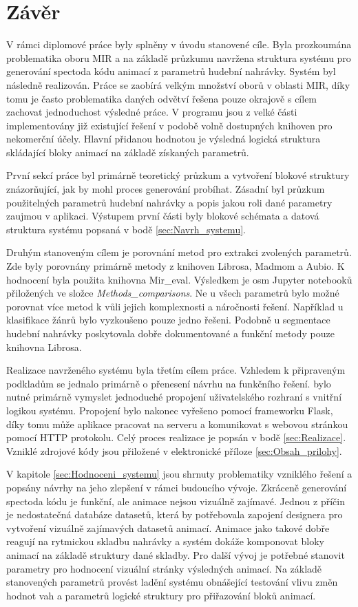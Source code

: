 \chapter*{Závěr}
{}


V rámci diplomové práce byly splněny v úvodu stanovené cíle. Byla prozkoumána problematika oboru \acs{MIR} a na základě průzkumu navržena struktura systému pro generování spectoda kódu animací z parametrů hudební nahrávky. Systém byl následně realizován. Práce se zaobírá velkým množství oborů v oblasti \acs{MIR}, díky tomu je často problematika daných odvětví řešena pouze okrajově s cílem zachovat jednoduchost výsledné práce. V programu jsou z velké části implementovány již existující řešení v podobě volně dostupných knihoven pro nekomerční účely. Hlavní přidanou hodnotou je výsledná logická struktura skládající bloky animací na základě získaných parametrů. 

První sekcí práce byl primárně teoretický průzkum a vytvoření blokové struktury znázorňující, jak by mohl proces generování probíhat. Zásadní byl průzkum použitelných parametrů hudební nahrávky a popis jakou roli dané parametry zaujmou v aplikaci. Výstupem první části byly blokové schémata a datová struktura systému popsaná v bodě \ref{sec:Navrh_systemu}. 

Druhým stanoveným cílem je porovnání metod pro extrakci zvolených parametrů. Zde byly porovnány primárně metody z knihoven Librosa, Madmom a Aubio. K hodnocení byla použita knihovna Mir\_eval. Výsledkem je osm Jupyter notebooků přiložených ve složce \textit{Methods\_comparisons}. Ne u všech parametrů bylo možné porovnat více metod k vůli jejich komplexnosti a náročnosti řešení. Například u klasifikace žánrů bylo vyzkoušeno pouze jedno řešeni. Podobně u segmentace hudební nahrávky poskytovala dobře dokumentované a funkční metody pouze knihovna Librosa. 

Realizace navrženého systému byla třetím cílem práce. Vzhledem k připraveným podkladům se jednalo primárně o přenesení návrhu na funkčního řešení. bylo nutné primárně vymyslet jednoduché propojení uživatelského rozhraní s vnitřní logikou systému. Propojení bylo nakonec vyřešeno pomocí frameworku Flask, díky tomu může aplikace pracovat na serveru a komunikovat s webovou stránkou pomocí \acs{HTTP} protokolu. Celý proces realizace je popsán v bodě \ref{sec:Realizace}. Vzniklé zdrojové kódy jsou přiložené v elektronické příloze \ref{sec:Obsah_prilohy}. 

V kapitole \ref{sec:Hodnoceni_systemu} jsou shrnuty problematiky vzniklého řešení a popsány návrhy na jeho zlepšení v rámci budoucího vývoje. Zkráceně generování spectoda kódu je funkční, ale animace nejsou vizuálně zajímavé. Jednou z příčin je nedostatečná databáze datasetů, která by potřebovala zapojení designera pro vytvoření vizuálně zajímavých datasetů animací. Animace jako takové dobře reagují na rytmickou skladbu nahrávky a systém dokáže komponovat bloky animací na základě struktury dané skladby. Pro další vývoj je potřebné stanovit parametry pro hodnocení vizuální stránky výsledných animací. Na základě stanovených parametrů provést ladění systému obnášející testování vlivu změn hodnot vah a parametrů logické struktury pro přiřazování bloků animací. 